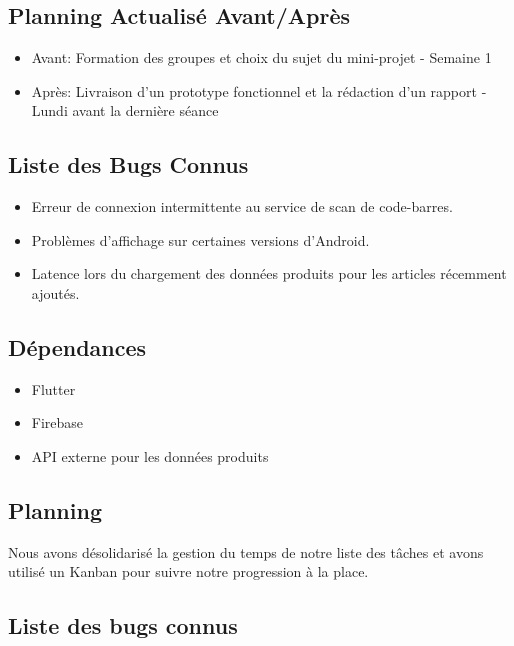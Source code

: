 \subsection{Planning Actualisé Avant/Après}

\begin{itemize}[noitemsep]
    \item Avant: Formation des groupes et choix du sujet du mini-projet - Semaine 1
    \item Après: Livraison d’un prototype fonctionnel et la rédaction d’un rapport - Lundi avant la dernière séance
\end{itemize}

\subsection{Liste des Bugs Connus}

\begin{itemize}[noitemsep]
    \item Erreur de connexion intermittente au service de scan de code-barres.
    \item Problèmes d'affichage sur certaines versions d'Android.
    \item Latence lors du chargement des données produits pour les articles récemment ajoutés.
\end{itemize}

\subsection{Dépendances}

\begin{itemize}[noitemsep]
    \item Flutter
    \item Firebase
    \item API externe pour les données produits
\end{itemize}


\subsection{Planning}

Nous avons désolidarisé la gestion du temps de notre liste des tâches et avons utilisé un Kanban pour suivre notre progression à la place.

\subsection{Liste des bugs connus}


